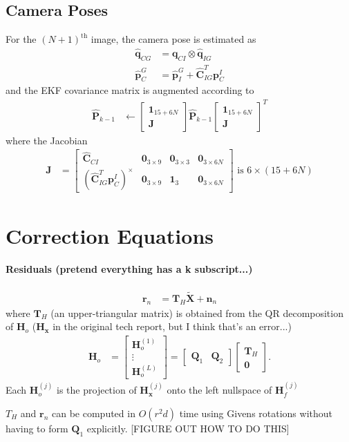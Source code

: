 \documentclass[10pt,letterpaper,fleqn,oneside]{article}
\newcommand{\nl}{\\[0.5em]}
\def\Vec#1{\mathbf{#1}} %
\newcommand{\bbm}{\begin{bmatrix}}
\newcommand{\ebm}{\end{bmatrix}}
\begin{document}
\subsection{Camera Poses}
For the $\left(N+1\right)^{\text{th}}$ image, the camera pose is estimated as
\begin{align}
\hat{\Vec{q}}_{C G} &= \left.\Vec{q}_{C I}\right.\otimes\left.\hat{\Vec{q}}_{I G}\right. \nl
\hat{\Vec{p}}^G_C &= \left.\hat{\Vec{p}}^G_I\right. + \hat{\Vec{C}}_{I G}^T \left.\Vec{p}^I_C\right.
\end{align}
and the EKF covariance matrix is augmented according to
\begin{align}
\hat{\Vec{P}}_{k-1} &\leftarrow \bbm \Vec{1}_{15+6N}  \nl \Vec{J}\ebm \hat{\Vec{P}}_{k-1} \bbm \Vec{1}_{15+6N}  \nl \Vec{J}\ebm^T
\end{align}
where the Jacobian
\begin{align}
\Vec{J} &= \bbm \hat{\Vec{C}}_{C I} & \Vec{0}_{3\times9} & \Vec{0}_{3\times3} & \Vec{0}_{3\times6N} \nl
							\left(\hat{\Vec{C}}_{I G}^T \left.\Vec{p}^I_C\right.\right)^\times & \Vec{0}_{3\times9} & \Vec{1}_3 & \Vec{0}_{3\times6N}
				\ebm \text{ is } 6\times\left(15 + 6N\right)
\end{align}


\section{Correction Equations}
\paragraph{Residuals (pretend everything has a k subscript...)}
\begin{align}
	\Vec{r}_n &= \Vec{T}_H \widetilde{\Vec{X}} + \Vec{n}_n
\end{align}
where $\Vec{T}_H$ (an upper-triangular matrix) is obtained from the QR decomposition of $\Vec{H}_o$ ($\Vec{H}_\Vec{x}$ in the original tech report, but I think that's an error...)
\begin{align}
\Vec{H}_o &= \bbm	\Vec{H}^{(1)}_o \nl \vdots \nl \Vec{H}^{(L)}_o \ebm
 = \bbm \Vec{Q}_1 & \Vec{Q}_2 \ebm \bbm \Vec{T}_H \nl \Vec{0} \ebm.
\end{align}
Each $\Vec{H}^{(j)}_o$ is the projection of $\Vec{H}^{(j)}_\Vec{x}$ onto the left nullspace of $\Vec{H}^{(j)}_f$

$T_H$ and $\Vec{r}_n$ can be computed in $O(r^2d)$ time using Givens rotations without having to form $\Vec{Q}_1$ explicitly. [FIGURE OUT HOW TO DO THIS]
\end{document}
